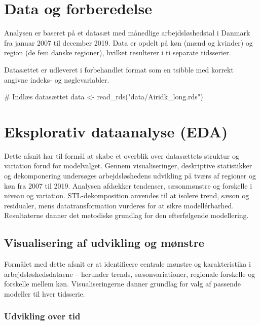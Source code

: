 \documentclass[
]{article}
\newenvironment{Shaded}{\begin{snugshade}}{\end{snugshade}}
\newcommand{\CommentTok}[1]{\textcolor[rgb]{0.37,0.37,0.37}{#1}}
\newcommand{\FunctionTok}[1]{\textcolor[rgb]{0.28,0.35,0.67}{#1}}
\newcommand{\NormalTok}[1]{\textcolor[rgb]{0.00,0.23,0.31}{#1}}
\newcommand{\OtherTok}[1]{\textcolor[rgb]{0.00,0.23,0.31}{#1}}
\newcommand{\StringTok}[1]{\textcolor[rgb]{0.13,0.47,0.30}{#1}}
\begin{document}
\section{Data og forberedelse}\label{data-og-forberedelse}

Analysen er baseret på et datasæt med månedlige arbejdsløshedstal i
Danmark fra januar 2007 til december 2019. Data er opdelt på køn (mænd
og kvinder) og region (de fem danske regioner), hvilket resulterer i ti
separate tidsserier.

Datasættet er udleveret i forbehandlet format som en tsibble med korrekt
angivne indeks- og nøglevariabler.

\begin{Shaded}
\begin{Highlighting}[]
\CommentTok{\# Indlæs datasættet}
\NormalTok{data }\OtherTok{\textless{}{-}} \FunctionTok{read\_rds}\NormalTok{(}\StringTok{"data/Airidk\_long.rds"}\NormalTok{)}
\end{Highlighting}
\end{Shaded}

\section{Eksplorativ dataanalyse
(EDA)}\label{eksplorativ-dataanalyse-eda}

Dette afsnit har til formål at skabe et overblik over datasættets
struktur og variation forud for modelvalget. Gennem visualiseringer,
deskriptive statistikker og dekomponering undersøges arbejdsløshedens
udvikling på tværs af regioner og køn fra 2007 til 2019. Analysen
afdækker tendenser, sæsonmønstre og forskelle i niveau og variation.
STL-dekomposition anvendes til at isolere trend, sæson og residualer,
mens datatransformation vurderes for at sikre modellérbarhed.
Resultaterne danner det metodiske grundlag for den efterfølgende
modellering.

\subsection{Visualisering af udvikling og
mønstre}\label{visualisering-af-udvikling-og-muxf8nstre}

Formålet med dette afsnit er at identificere centrale mønstre og
karakteristika i arbejdsløshedsdataene -- herunder trends,
sæsonvariationer, regionale forskelle og forskelle mellem køn.
Visualiseringerne danner grundlag for valg af passende modeller til hver
tidsserie.

\subsubsection{Udvikling over tid}\label{udvikling-over-tid}
\end{document}

